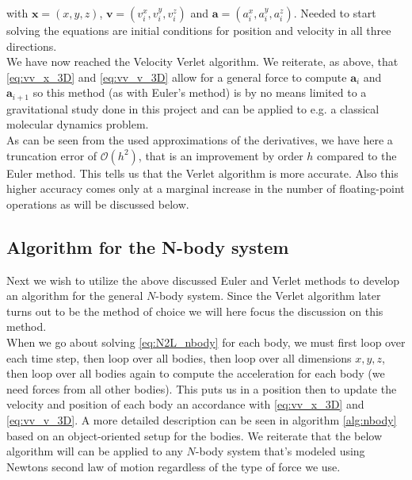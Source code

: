\documentclass[12pt]{article}
\numberwithin{figure}{section}
\numberwithin{table}{section}
\begin{document}
with $\mathbf{x}=(x,y,z)$, $\mathbf{v}=(v_i^x,v_i^y,v_i^z)$ and $\mathbf{a}=(a_i^x,a_i^y,a_i^z)$. Needed to start solving the equations are initial conditions for position and velocity in all three directions. \\
\noindent We have now reached the Velocity Verlet algorithm. We reiterate, as above, that \eqref{eq:vv_x_3D} and \eqref{eq:vv_v_3D} allow for a general force to compute $\mathbf{a}_i$ and $\mathbf{a}_{i+1}$ so this method (as with Euler's method) is by no means limited to a gravitational study done in this project and can be applied to e.g. a classical molecular dynamics problem. \\

\noindent As can be seen from the used approximations of the derivatives, we have here a truncation error of $\mathcal{O}(h^2)$, that is an improvement by order $h$ compared to the Euler method. This tells us that the Verlet algorithm is more accurate. Also this higher accuracy comes only at a marginal increase in the number of floating-point operations as will be discussed below.

\subsection{Algorithm for the N-body system} \label{sec:nbody_alg}
Next we wish to utilize the above discussed Euler and Verlet methods to develop an algorithm for the general $N$-body system. Since the Verlet algorithm later turns out to be the method of choice we will here focus the discussion on this method. \\

\noindent When we go about solving \eqref{eq:N2L_nbody} for each body, we must first loop over each time step, then loop over all bodies, then loop over all dimensions $x,y,z$, then loop over all bodies again to compute the acceleration for each body (we need forces from all other bodies). This puts us in a position then to update the velocity and position of each body an accordance with \eqref{eq:vv_x_3D} and \eqref{eq:vv_v_3D}. A more detailed description can be seen in algorithm \ref{alg:nbody} based on an object-oriented setup for the bodies. We reiterate that the below algorithm will can be applied to any $N$-body system that's modeled using Newtons second law of motion regardless of the type of force we use.
\end{document}
